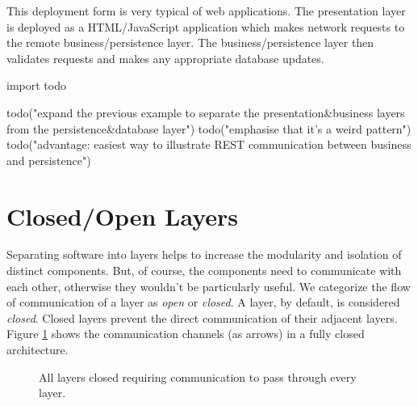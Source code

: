 This deployment form is very typical of web applications.
The presentation layer is deployed as a HTML/JavaScript application which makes network requests to the remote business/persistence layer.
The business/persistence layer then validates requests and makes any appropriate database updates.

\begin{code}[style=python]
import todo

todo("expand the previous example to separate the presentation&business layers from the persistence&database layer")
todo("emphasise that it's a weird pattern")
todo("advantage: easiest way to illustrate REST communication between business and persistence")
\end{code}

\section{Closed/Open Layers}

Separating software into layers helps to increase the modularity and isolation of distinct components.
But, of course, the components need to communicate with each other, otherwise they wouldn't be particularly useful.
We categorize the flow of communication of a layer as \textsl{open} or \textsl{closed}.
A layer, by default, is considered \textsl{closed}.
Closed layers prevent the direct communication of their adjacent layers.
Figure \ref{fig:closed-layers} shows the communication channels (as arrows) in a fully closed architecture.

\begin{figure}[h]
    \centering
    \caption{All layers closed requiring communication to pass through every layer.}
    \label{fig:closed-layers}
\end{figure}

